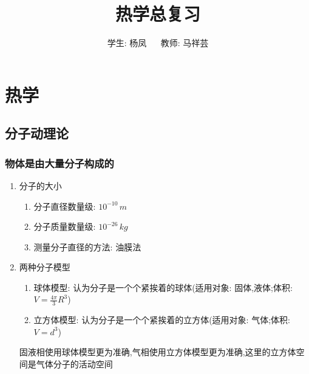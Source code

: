 \documentclass{article}
\title{热学总复习}
\author{学生: 杨凤 $\quad$ 教师: 马祥芸}
\begin{document}
\maketitle
\tableofcontents
{}
\newpage


\section{热学}
\subsection{分子动理论}
\subsubsection{物体是由大量分子构成的}
\begin{enumerate}
    \item 分子的大小
          \begin{enumerate}[label = (\arabic*{})]
              \item 分子直径数量级: $10^{-10} \, m$
              \item 分子质量数量级: $10^{-26} \, kg$
              \item 测量分子直径的方法: 油膜法
          \end{enumerate}

          \vspace{2em}

    \item 两种分子模型
          \begin{enumerate}[label = (\arabic*{})]
              \item 球体模型: 认为分子是一个个紧挨着的球体(适用对象: 固体,液体;体积:$V = \frac{4\pi}{3} R^{3}$)
              \item 立方体模型: 认为分子是一个个紧挨着的立方体(适用对象: 气体;体积:$V = d^{3}$)
          \end{enumerate}

          \vspace{-1em}
          \hspace{1em}\begin{adjustbox}{minipage=0.86\linewidth, bgcolor=gray!20, padding=1em}
              \small
              固液相使用球体模型更为准确,气相使用立方体模型更为准确,这里的立方体空间是气体分子的活动空间
          \end{adjustbox}
          \vspace{-1em}

          \vspace{2em}


\end{enumerate}
\end{document}
